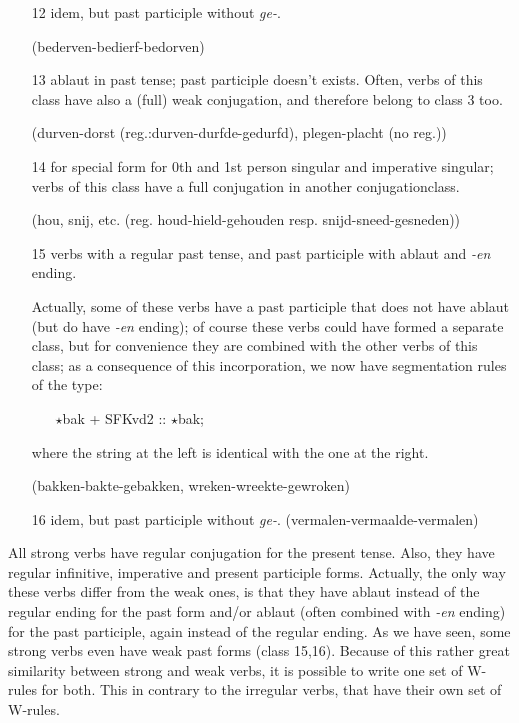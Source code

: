 \begin{itemize}
  \item [12] idem, but past participle without {\em ge-}. 

        (bederven-bedierf-bedorven)

  \item [13] ablaut in past tense; past participle doesn't exists.
        Often, verbs of this class have also a (full) weak conjugation,
        and therefore belong to class 3 too. 

        (durven-dorst (reg.:durven-durfde-gedurfd), plegen-placht (no reg.))

  \item [14] for special form for 0th and 1st person singular and 
        imperative singular; verbs of this class have a full conjugation in
        another conjugationclass.

        (hou, snij, etc. (reg. houd-hield-gehouden resp. snijd-sneed-gesneden))

  \item [15] verbs with a regular past tense, and past participle with ablaut 
        and {\em -en} ending. 

        Actually, some of these verbs have a past participle that does
        not have ablaut (but do have {\em -en} ending); of course these verbs
        could have formed a separate class, but for convenience they are 
        combined with the other verbs of this class; as a consequence of this
        incorporation, we now have segmentation rules of the type:

\begin{itemize}
          \item [] $\star$bak + SFKvd2 :: $\star$bak;
\end{itemize}

        where the string at the left is identical with the one at the right.

        (bakken-bakte-gebakken, wreken-wreekte-gewroken)

  \item [16] idem, but past participle without {\em ge-}. 
        (vermalen-vermaalde-vermalen)

\end{itemize}
        

All strong verbs have regular conjugation for the present tense. Also,
they have regular infinitive, imperative and present participle forms.
Actually, the only way these verbs differ from the weak ones, is that they
have ablaut instead of the regular ending for the past form and/or ablaut 
(often combined with {\em -en} ending) for the past participle, again instead of
the regular ending. As we have seen, some strong verbs even have weak
past forms (class 15,16). Because of this rather great similarity between
strong and weak verbs, it is possible to write one set of 
W-rules for both. This in contrary to the irregular verbs, 
that have their own set of W-rules.

